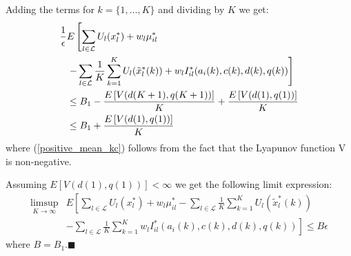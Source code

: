 \documentclass[conference]{IEEEtran}
\begin{document}
Adding the terms for $k=\{ 1, \ldots, K \}$ and dividing by $K$ we get:
\begin{align}
	\frac{1}{\epsilon} & E \left[ \sum_{l \in \mathcal{L}} U_l(x_l^*) + w_l \mu^*_{il} \right. \notag \\
	& \left. - \sum_{l \in \mathcal{L}} \frac{1}{K} \sum_{k=1}^K U_l(\tilde{x}_l^*(k)) + w_l I_{il}^*(a_i(k),c(k),d(k),q(k)) \right] \notag \\
	& \leq B_1 - \frac{E\left[ V(d(K+1),q(K+1)) \right]}{K} + \frac{E\left[ V(d(1),q(1)) \right]}{K} \notag \\
	& \leq B_1 + \frac{E\left[ V(d(1),q(1)) \right]}{K} \label{positive_mean_kc}
\end{align}
where (\ref{positive_mean_kc}) follows from the fact that the Lyapunov function V is non-negative.

Assuming $E\left[ V(d(1),q(1)) \right] < \infty$ we get the following limit expression:
\begin{align*}
	\limsup_{K \rightarrow \infty} & E \left[ \sum_{l \in \mathcal{L}} U_l(x_l^*) + w_l \mu^*_{il} - \sum_{l \in \mathcal{L}} \frac{1}{K} \sum_{k=1}^K U_l(\tilde{x}_l^*(k)) \right. \\
	& \left. - \sum_{l \in \mathcal{L}} \frac{1}{K} \sum_{k=1}^K w_l I_{il}^*(a_i(k),c(k),d(k),q(k)) \right] \leq B \epsilon
\end{align*}
where $B=B_1$.\hfill $\blacksquare$
\end{document}
